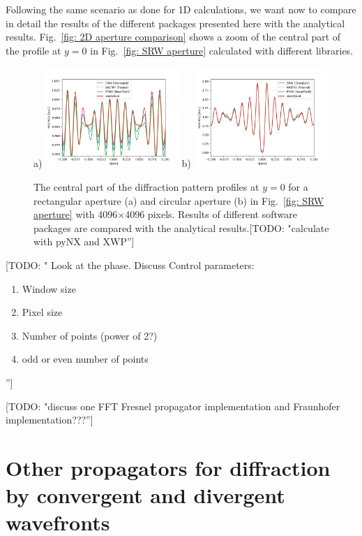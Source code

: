 \documentclass{iucr}              %
\newcommand{\todo}[1]{{\color{red}[TODO: "#1'']}}
\begin{document}
Following the same scenario as done for 1D calculations, we want now to compare in detail the results of the different packages presented here with the analytical results. Fig.~\ref{fig: 2D aperture comparison} shows a zoom of the central part of the profile at $y=0$ in Fig.~\ref{fig: SRW aperture} calculated with different libraries. 
\begin{figure}
\label{fig: SRW aperture comparison}
\caption{The central part of the diffraction pattern profiles at $y=0$ for a rectangular aperture (a) and circular aperture (b) in Fig.~\ref{fig: SRW aperture} with 4096$\times$4096 pixels. Results of different software packages are compared with the analytical results.\todo{calculate with pyNX and XWP}
}
a)
\includegraphics[width=0.45\textwidth]{aperture_2D_rectangular_profile_comparison.png}
b)
\includegraphics[width=0.45\textwidth]{aperture_2D_circular_profile_comparison.png}
\end{figure}


\todo{ Look at the phase. Discuss Control parameters: 
\begin{enumerate}
\item Window size
\item Pixel size
\item Number of points (power of 2?)
\item odd or even number of points
\end{enumerate}
 
}

\todo{discuss one FFT Fresnel propagator implementation and Fraunhofer implementation???}

\section{Other propagators for diffraction by convergent and divergent wavefronts}
\label{ch: propagators convergent}
\end{document}

